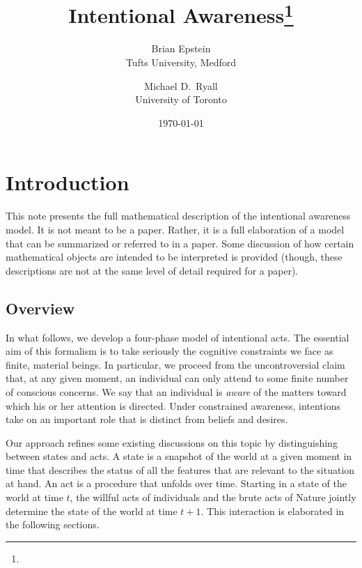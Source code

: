 \documentclass[
11pt,
titlepage,
reqno,
]{article}%
\theoremstyle{definition}
\begin{document}
	
\title{Intentional Awareness\thanks{}
}
\author
{
Brian Epstein \\Tufts University, Medford
\and 
Michael D.\ Ryall \\University of Toronto 
}
\date{\today}
\maketitle
	
	
	
\def\baselinestretch{1.5}\small\normalsize
\newcommand{\ra}[1]{\renewcommand{\arraystretch}{#1}}%
\newpage



\section{Introduction}\label{sec: intro}
This note presents the full mathematical description of the intentional awareness model. 
It is not meant to be a paper.
Rather, it is a full elaboration of a model that can be summarized or referred to in a paper.
Some discussion of how certain mathematical objects are intended to be interpreted is provided (though, these descriptions are not at the same level of detail required for a paper).

\subsection{Overview}
In what follows, we develop a four-phase model of intentional acts. 
The essential aim of this formalism is to take seriously the cognitive constraints we face as finite, material beings.
In particular, we proceed from the uncontroversial claim that, at any given moment, an individual can only  attend to some finite number of conscious concerns. 
We say that an individual is \textit{aware} of the matters toward which his or her attention is directed.
Under constrained awareness, intentions take on an important role that is distinct from beliefs and desires.

Our approach refines some existing discussions on this topic by distinguishing between states and acts. 
A state is a snapshot of the world at a given moment in time that describes the status of all the features that are relevant to the situation at hand. 
An act is a procedure that unfolds over time. 
Starting in a state of the world at time $t$, the willful acts of individuals and the brute acts of Nature jointly determine the state of the world at time $t+1$.
This interaction is elaborated in the following sections.
\end{document}
